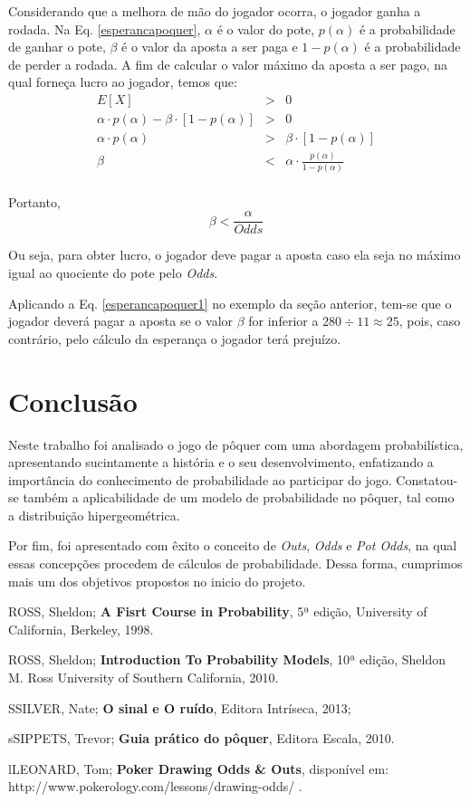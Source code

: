 \documentclass[
	12pt,				%
	oneside,			%
	a4paper,			%
	chapter=TITLE,		%
	section=TITLE,		%
	subsection=Title,	%
	subsubsection=Title,%
	brazil,				%
	]{abntex2}
\begin{document}
Considerando que a melhora de mão do jogador ocorra, o jogador ganha a rodada. Na Eq. \ref{esperancapoquer}, $\alpha$ é o valor do pote, $p(\alpha)$ é a probabilidade de ganhar o pote, $\beta$ é o valor da aposta a ser paga e $1 - p(\alpha)$ é a probabilidade de perder a rodada. 
A fim de calcular o valor máximo da aposta a ser pago, na qual forneça lucro ao jogador, temos que: 
\begin{eqnarray*}
	E[X] & > & 0 \\
	\alpha \cdot p(\alpha) - \beta \cdot [1 - p(\alpha)] &>& 0 \\
	\alpha \cdot p(\alpha) &>& \beta \cdot [1 - p(\alpha)] \\
	\beta &<& \alpha \cdot \frac{p(\alpha)}{1 - p(\alpha)} \\
\end{eqnarray*}

\vspace{-35pt}Portanto,
\begin{equation} \label{esperancapoquer1}
\beta < \frac{\alpha}{Odds}
\end{equation}

Ou seja, para obter lucro, o jogador deve pagar a aposta caso ela seja no máximo igual ao quociente do pote pelo \textit{Odds}.

Aplicando a Eq. \ref{esperancapoquer1} no exemplo da seção anterior, tem-se que o jogador deverá pagar a aposta se o valor $\beta$ for inferior a $280 \div 11 \approx 25$, pois, caso contrário, pelo cálculo da esperança o jogador terá prejuízo.

\chapter{Conclusão}
Neste trabalho foi analisado o jogo de pôquer com uma abordagem probabilística, apresentando sucintamente a história e o seu desenvolvimento, enfatizando a importância do conhecimento de probabilidade ao participar do jogo. Constatou-se também a aplicabilidade de um modelo de probabilidade no pôquer, tal como a distribuição hipergeométrica.

Por fim,  foi apresentado com êxito o conceito de \textit{Outs}, \textit{Odds} e \textit{Pot Odds}, na qual essas concepções procedem de cálculos de probabilidade. Dessa forma, cumprimos mais um dos objetivos propostos no inicio do projeto.

\begin{thebibliography}{5}
	\nocite{}
	 ROSS, Sheldon; \textbf{A Fisrt Course in Probability}, 5ª edição, University of California, Berkeley, 1998.
	
	 ROSS, Sheldon; \textbf{Introduction To Probability Models}, 10ª edição, Sheldon M. Ross	University of Southern California, 2010.
	
	\bibitem[silver] SSILVER, Nate; \textbf{O sinal e O ruído}, Editora Intríseca, 2013;
	
	\bibitem[trevor] sSIPPETS, Trevor; \textbf{Guia prático do pôquer}, Editora Escala, 2010.
	
	\bibitem[adiga] lLEONARD, Tom; \textbf{Poker Drawing Odds \& Outs}, disponível em: http://www.pokerology.com/lessons/drawing-odds/ .	
\end{thebibliography}
\end{document}
